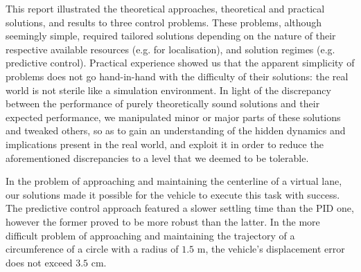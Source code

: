 This report illustrated the theoretical approaches, theoretical and
practical solutions, and results to three control problems. These problems,
although seemingly simple, required tailored solutions depending on the
nature of their respective available resources (e.g. for localisation),
and solution regimes (e.g. predictive control). Practical experience showed us
that the apparent simplicity of problems does not go hand-in-hand with the
difficulty of their solutions: the real world is not sterile like a simulation
environment. In light of the discrepancy between the performance of purely
theoretically sound solutions and their expected performance, we manipulated
minor or major parts of these solutions and tweaked others, so as to gain an
understanding of the hidden dynamics and implications present in the real world,
and exploit it in order to reduce the aforementioned discrepancies to a level
that we deemed to be tolerable.

In the problem of approaching and maintaining the centerline of a virtual
lane, our solutions made it possible for the vehicle to execute this task
with success. The predictive control approach featured a slower settling time
than the PID one, however the former proved to be more robust than the latter.
In the more difficult problem of approaching and maintaining the trajectory
of a circumference of a circle with a radius of $1.5$ m, the vehicle's
displacement error does not exceed $3.5$ cm.
